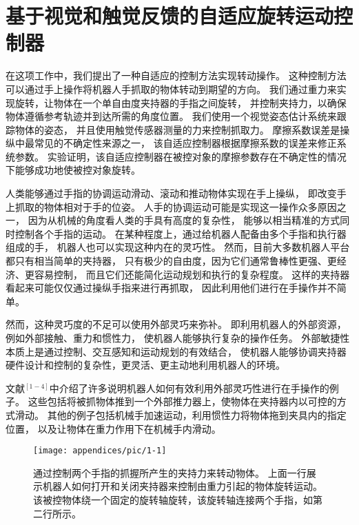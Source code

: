 \setcounter{appequ}{0}
\renewcommand\theequation{\arabic{appequ}}

\setlength{\parsep}{0ex}%
\setlength{\topsep}{1ex}%
\setlength{\itemsep}{0ex}%

\chapter{基于视觉和触觉反馈的自适应旋转运动控制器}\label{apx_1}

在这项工作中，我们提出了一种自适应的控制方法实现转动操作。
这种控制方法可以通过手上操作将机器人手抓取的物体转动到期望的方向。
我们通过重力来实现旋转，让物体在一个单自由度夹持器的手指之间旋转，
并控制夹持力，以确保物体遵循参考轨迹并到达所需的角度位置。
我们使用一个视觉姿态估计系统来跟踪物体的姿态，
并且使用触觉传感器测量的力来控制抓取力。
摩擦系数误差是操纵中最常见的不确定性来源之一，
该自适应控制器根据摩擦系数的误差来修正系统参数。
实验证明，该自适应控制器在被控对象的摩擦参数存在不确定性的情况下能够成功地使被控对象旋转。

人类能够通过手指的协调运动滑动、滚动和推动物体实现在手上操纵，
即改变手上抓取的物体相对于手的位姿。
人手的协调运动可能是实现这一操作众多原因之一，
因为从机械的角度看人类的手具有高度的复杂性，
能够以相当精准的方式同时控制各个手指的运动。
在某种程度上，通过给机器人配备由多个手指和执行器组成的手，
机器人也可以实现这种内在的灵巧性。
然而，目前大多数机器人平台都只有相当简单的夹持器，
只有极少的自由度，因为它们通常鲁棒性更强、更经济、更容易控制，
而且它们还能简化运动规划和执行的复杂程度。
这样的夹持器看起来可能仅仅通过操纵手指来进行再抓取，
因此利用他们进行在手操作并不简单。

然而，这种灵巧度的不足可以使用外部灵巧来弥补。
即利用机器人的外部资源，例如外部接触、重力和惯性力，
使机器人能够执行复杂的操作任务。
外部敏捷性本质上是通过控制、交互感知和运动规划的有效结合，
使机器人能够协调夹持器硬件设计和控制的复杂性，更灵活、更主动地利用机器人的环境。

文献$^{[1-4]}$中介绍了许多说明机器人如何有效利用外部灵巧性进行在手操作的例子。
这些包括将被抓物体推到一个外部推力器上，使物体在夹持器内以可控的方式滑动。
其他的例子包括机械手加速运动，利用惯性力将物体拖到夹具内的指定位置，
以及让物体在重力作用下在机械手内滑动。

\begin{figure}[!ht]
  \centering
  \texttt{[image: appendices/pic/1-1]}
  \caption*{
    通过控制两个手指的抓握所产生的夹持力来转动物体。
    上面一行展示机器人如何打开和关闭夹持器来控制由重力引起的物体旋转运动。
    该被控物体绕一个固定的旋转轴旋转，该旋转轴连接两个手指，如第二行所示。}
  \vspace{-0.3cm}
\end{figure}


